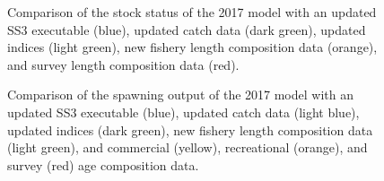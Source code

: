 \documentclass[
]{scrartcl}
\begin{document}
\begin{figure}


\caption{\label{fig-newdata_2}Comparison of the stock status of the 2017
model with an updated SS3 executable (blue), updated catch data (dark
green), updated indices (light green), new fishery length composition
data (orange), and survey length composition data (red).}

\end{figure}%

\begin{figure}


\caption{\label{fig-newdata_3}Comparison of the spawning output of the
2017 model with an updated SS3 executable (blue), updated catch data
(light blue), updated indices (dark green), new fishery length
composition data (light green), and commercial (yellow), recreational
(orange), and survey (red) age composition data.}

\end{figure}%
\end{document}
